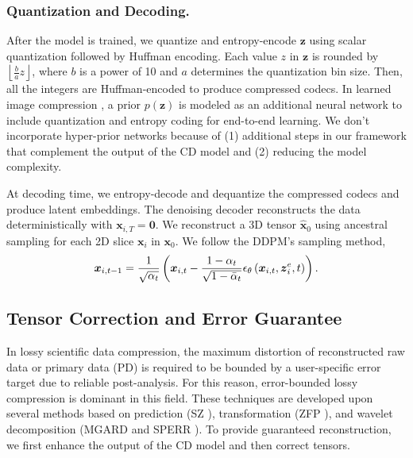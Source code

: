 
\subsubsection{Quantization and Decoding.}
After the model is trained, we quantize and entropy-encode $\boldsymbol{z}$ using scalar quantization followed by Huffman encoding. Each value $z$ in $\boldsymbol{z}$ is rounded by $\left\lfloor \frac{b}{a}z\right\rfloor$, where $b$ is a power of 10 and $a$ determines the quantization bin size. Then, all the integers are Huffman-encoded to produce compressed codecs. In learned image compression \cite{Balle2017,Balle2018,Minnen2018}, a prior $p\left(\boldsymbol{z}\right)$ is modeled as an additional neural network to include quantization and entropy coding for end-to-end learning. We don't incorporate hyper-prior networks because of (1) additional steps in our framework that complement the output of the CD model and (2) reducing the model complexity.

At decoding time, we entropy-decode and dequantize the compressed codecs and produce latent embeddings. The denoising decoder reconstructs the data deterministically with $\boldsymbol{x}_{i,T}=\boldsymbol{0}$. We reconstruct a 3D tensor $\hat{\boldsymbol{x}}_0$ using ancestral sampling for each 2D slice $\boldsymbol{x}_{i}$ in $\boldsymbol{x}_0$. We follow the DDPM's sampling method,
\begin{equation}
    \boldsymbol{x}_{i,t-1}=\frac{1}{\sqrt{\alpha_t}}\left(\boldsymbol{x}_{i,t}-\frac{1-\alpha_t}{\sqrt{1-\Bar{\alpha}_t}}\epsilon_\theta\left(\boldsymbol{x}_{i,t},\boldsymbol{z}_i^e, t\right)\right).
\end{equation}


\subsection{Tensor Correction and Error Guarantee}\label{subsec:tc_eg}
In lossy scientific data compression, the maximum distortion of reconstructed raw data or primary data (PD) is required to be bounded by a user-specific error target due to reliable post-analysis. For this reason, error-bounded lossy compression is dominant in this field. These techniques are developed upon several methods based on prediction (SZ \cite{SZ3}), transformation (ZFP \cite{ZFP2}), and wavelet decomposition (MGARD \cite{MGARD_3} and SPERR \cite{SPERR}). To provide guaranteed reconstruction, we first enhance the output of the CD model and then correct tensors.
\vspace{-0.6cm}
